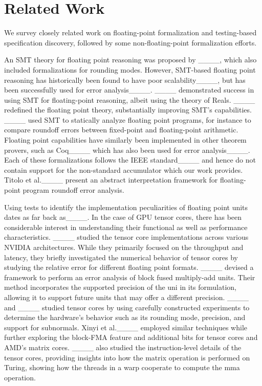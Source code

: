 \section{Related Work}
\label{sec:relwork}
We survey closely related work on floating-point formalization and testing-based specification discovery, followed by some non-floating-point formalization efforts.

An SMT theory for floating point reasoning was proposed by ____, which also included formalizations for rounding modes.  However, SMT-based floating point reasoning has historically been found to have poor scalability____, but has been successfully used for error analysis____. ____ demonstrated success in using SMT for floating-point reasoning, albeit using the theory of Reals.  ____ redefined the floating point theory, substantially improving SMT's capabilities.  ____ used SMT to statically analyze floating point programs, for instance to compare roundoff errors between fixed-point and floating-point arithmetic. Floating point capabilities have similarly been implemented in other theorem provers, such as Coq____ which has also been used for error analysis____. Each of these formalizations follows the IEEE standard____ and hence do not contain support for the non-standard accumulator which our work provides.
Titolo et al.____ present an abstract interpretation framework for floating-point program roundoff error analysis.

Using tests to identify the implementation peculiarities of floating point units dates as far back as____.  
In the case of GPU tensor cores, there has been considerable interest in understanding their functional as well as performance characteristics. ____ studied the tensor core implementations across various NVIDIA architectures.  While they primarily focused on the throughput and latency, they briefly investigated the numerical behavior of tensor cores by studying the relative error for different floating point formats. ____ devised a framework to perform an error analysis of block fused multiply-add units.  Their method incorporates the supported precision of the uni in its formulation, allowing it to support future units that may offer a different precision. ____ and ____ studied tensor cores by using carefully constructed experiments to determine the hardware's behavior such as its rounding mode, precision, and support for subnormals. Xinyi et al.____ employed similar techniques while further exploring the block-FMA feature and additional bits for tensor cores and AMD's matrix cores.  ____ also studied the instruction-level details of the tensor cores, providing insights into how the matrix operation is performed on Turing, showing how the threads in a warp cooperate to compute the mma operation.

